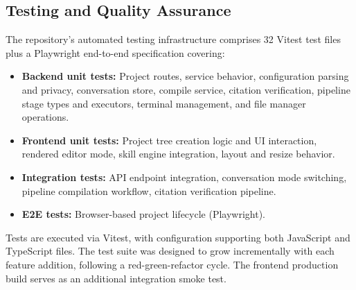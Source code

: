 \subsection{Testing and Quality Assurance}

The repository's automated testing infrastructure comprises 32 Vitest test
files plus a Playwright end-to-end specification covering:
\begin{itemize}
  \item \textbf{Backend unit tests:} Project routes, service behavior,
  configuration parsing and privacy, conversation store, compile service,
  citation verification, pipeline stage types and executors, terminal
  management, and file manager operations.
  \item \textbf{Frontend unit tests:} Project tree creation logic and UI
  interaction, rendered editor mode, skill engine integration, layout and
  resize behavior.
  \item \textbf{Integration tests:} API endpoint integration, conversation
  mode switching, pipeline compilation workflow, citation verification
  pipeline.
  \item \textbf{E2E tests:} Browser-based project lifecycle (Playwright).
\end{itemize}

Tests are executed via Vitest, with configuration supporting both JavaScript
and TypeScript files. The test suite was designed to grow incrementally with
each feature addition, following a red-green-refactor cycle. The frontend
production build serves as an additional integration smoke test.
